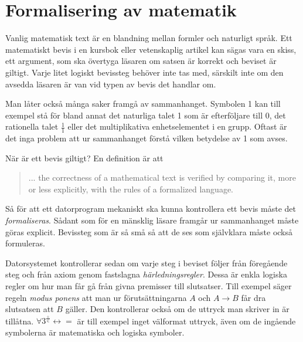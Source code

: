 \section{Formalisering av matematik}
Vanlig matematisk text är en blandning mellan formler och naturligt språk. Ett
matematiskt bevis i en kursbok eller vetenskaplig artikel kan sägas vara en
skiss, ett argument, som ska övertyga läsaren om satsen är korrekt och beviset
är giltigt. Varje litet logiskt bevissteg behöver inte tas med, särskilt inte
om den avsedda läsaren är van vid typen av bevis det handlar om.

Man låter också många saker framgå av sammanhanget. Symbolen 1 kan till exempel
stå för bland annat det naturliga talet 1 som är efterföljare till 0, det
rationella talet $\frac{1}{1}$ eller det multiplikativa enhetselementet i en
grupp. Oftast är det inga problem att ur sammanhanget förstå vilken betydelse
av 1 som avses.

När är ett bevis giltigt? En definition är att
\begin{quote}
... the correctness of a mathematical text is verified by comparing it, more or
less explicitly, with the rules of a formalized language\cite{bourbaki}.
\end{quote}

Så för att ett datorprogram mekaniskt ska kunna kontrollera ett bevis måste det
\emph{formaliseras}. Sådant som för en mänsklig läsare framgår ur sammanhanget
måste göras explicit. Bevissteg som är så små så att de ses som självklara
måste också formuleras.

Datorsystemet kontrollerar sedan om varje steg i beviset följer från föregående
steg och från axiom genom fastslagna \emph{härledningsregler}. Dessa är enkla
logiska regler om hur man får gå från givna premisser till slutsatser. Till
exempel säger regeln \emph{modus ponens} att man ur förutsättningarna $A$ och
$A \to B$ får dra slutsatsen att $B$ gäller. Den kontrollerar också om de
uttryck man skriver in är tillåtna.
$\forall 3^{\frac{+}{\in}} \leftrightarrow =$ är till exempel inget välformat
uttryck, även om de ingående symbolerna är matematiska och logiska symboler.

